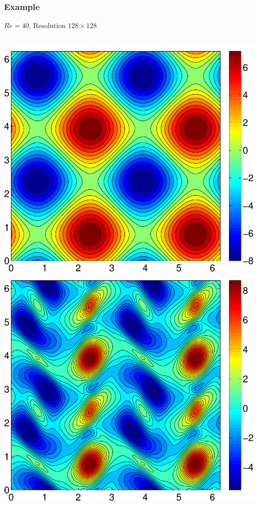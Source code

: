 \documentclass[mathserif]{beamer} %
\begin{document}
%
\begin{frame}
	\frametitle{Example}
	$Re=40$, Resolution $128\times 128$\\ \vspace{.5cm}
	\begin{columns}
		\centering
		\includegraphics[width=\textwidth]{Kol_R40_n128_vort_E2_t0}
		\centering
		\includegraphics[width=\textwidth]{Kol_R40_n128_vort_E2_adj_t5e3}

\end{columns}
\end{frame}
\end{document}
